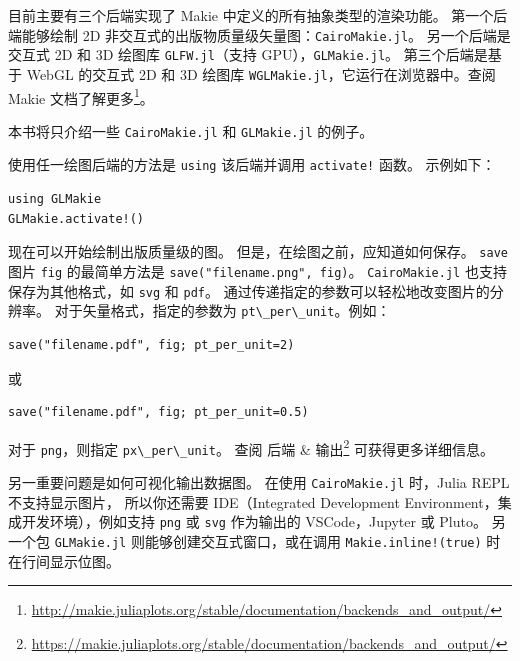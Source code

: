 \documentclass[
  notoc %
]{tufte-book}
\DeclareRobustCommand{\href}[2]{#2\footnote{\url{#1}}}
\newcommand{\passthrough}[1]{#1}
\begin{document}
目前主要有三个后端实现了 Makie 中定义的所有抽象类型的渲染功能。
第一个后端能够绘制 2D
非交互式的出版物质量级矢量图：\passthrough{\lstinline!CairoMakie.jl!}。
另一个后端是交互式 2D 和 3D 绘图库
\passthrough{\lstinline!GLFW.jl!}（支持
GPU），\passthrough{\lstinline!GLMakie.jl!}。 第三个后端是基于 WebGL
的交互式 2D 和 3D 绘图库
\passthrough{\lstinline!WGLMakie.jl!}，它运行在浏览器中。\href{http://makie.juliaplots.org/stable/documentation/backends_and_output/}{查阅
Makie 文档了解更多}。

本书将只介绍一些 \passthrough{\lstinline!CairoMakie.jl!} 和
\passthrough{\lstinline!GLMakie.jl!} 的例子。

使用任一绘图后端的方法是 \passthrough{\lstinline!using!} 该后端并调用
\passthrough{\lstinline"activate!"} 函数。 示例如下：

\begin{lstlisting}
using GLMakie
GLMakie.activate!()
\end{lstlisting}

现在可以开始绘制出版质量级的图。 但是，在绘图之前，应知道如何保存。
\passthrough{\lstinline!save!} 图片 \passthrough{\lstinline!fig!}
的最简单方法是 \passthrough{\lstinline!save("filename.png", fig)!}。
\passthrough{\lstinline!CairoMakie.jl!} 也支持保存为其他格式，如
\passthrough{\lstinline!svg!} 和 \passthrough{\lstinline!pdf!}。
通过传递指定的参数可以轻松地改变图片的分辨率。
对于矢量格式，指定的参数为
\passthrough{\lstinline!pt\_per\_unit!}。例如：

\begin{lstlisting}
save("filename.pdf", fig; pt_per_unit=2)
\end{lstlisting}

或

\begin{lstlisting}
save("filename.pdf", fig; pt_per_unit=0.5)
\end{lstlisting}

对于 \passthrough{\lstinline!png!}，则指定
\passthrough{\lstinline!px\_per\_unit!}。 查阅
\href{https://makie.juliaplots.org/stable/documentation/backends_and_output/}{后端
\& 输出} 可获得更多详细信息。

另一重要问题是如何可视化输出数据图。 在使用
\passthrough{\lstinline!CairoMakie.jl!} 时，Julia REPL 不支持显示图片，
所以你还需要 IDE（Integrated Development
Environment，集成开发环境），例如支持 \passthrough{\lstinline!png!} 或
\passthrough{\lstinline!svg!} 作为输出的 VSCode，Jupyter 或 Pluto。
另一个包 \passthrough{\lstinline!GLMakie.jl!}
则能够创建交互式窗口，或在调用
\passthrough{\lstinline"Makie.inline!(true)"} 时在行间显示位图。
\end{document}
